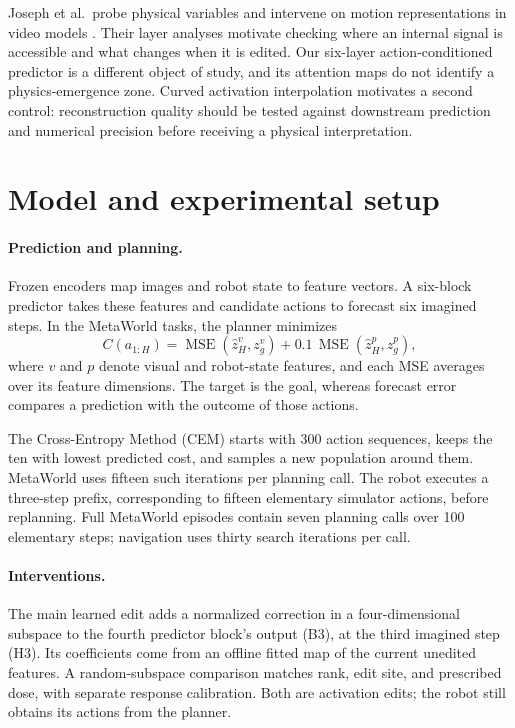\documentclass{article}
\newcommand{\MSE}{\operatorname{MSE}}
\begin{document}
Joseph et al.\ probe physical variables and intervene on motion representations in video models \citep{joseph2026interpretingphysics}. Their layer analyses motivate checking where an internal signal is accessible and what changes when it is edited. Our six-layer action-conditioned predictor is a different object of study, and its attention maps do not identify a physics-emergence zone. Curved activation interpolation \citep{wurgaft2026manifoldsteering} motivates a second control: reconstruction quality should be tested against downstream prediction and numerical precision before receiving a physical interpretation.

\section{Model and experimental setup}

\paragraph{Prediction and planning.}
Frozen encoders map images and robot state to feature vectors. A six-block predictor takes these features and candidate actions to forecast six imagined steps. In the MetaWorld tasks, the planner minimizes
\begin{equation}
 C(a_{1:H})=\MSE(\hat z^v_H,z^v_g)+0.1\,\MSE(\hat z^p_H,z^p_g),
 \label{eq:main-cost}
\end{equation}
where $v$ and $p$ denote visual and robot-state features, and each MSE averages over its feature dimensions. The target is the goal, whereas forecast error compares a prediction with the outcome of those actions.

The Cross-Entropy Method (CEM) starts with 300 action sequences, keeps the ten with lowest predicted cost, and samples a new population around them. MetaWorld uses fifteen such iterations per planning call. The robot executes a three-step prefix, corresponding to fifteen elementary simulator actions, before replanning. Full MetaWorld episodes contain seven planning calls over 100 elementary steps; navigation uses thirty search iterations per call.

\paragraph{Interventions.}
The main learned edit adds a normalized correction in a four-dimensional subspace to the fourth predictor block's output (B3), at the third imagined step (H3). Its coefficients come from an offline fitted map of the current unedited features. A random-subspace comparison matches rank, edit site, and prescribed dose, with separate response calibration. Both are activation edits; the robot still obtains its actions from the planner.
\end{document}
